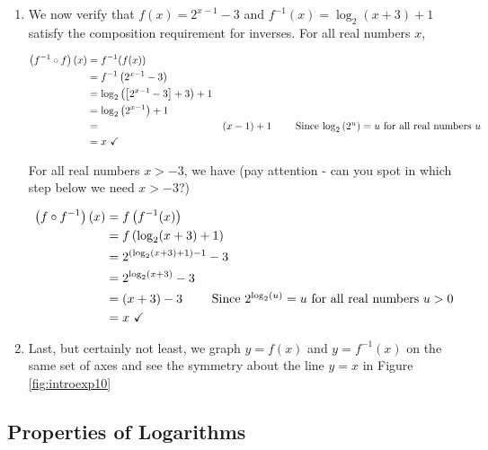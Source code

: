 {\begin{enumerate}
\item  We now verify that $f(x) = 2^{x-1}-3$ and $f^{-1}(x) = \log_{2}(x+3)+1$ satisfy the composition requirement for inverses.  For all real numbers $x$, 

\begin{align*}
\left(f^{-1}\circ f\right)(x) & =  f^{-1}(f(x))  \\
& =  f^{-1}\left(2^{x-1}-3 \right)  \\
& =  \log_{2}\left( \left[2^{x-1}-3\right]+3 \right)+1  \\
& =  \log_{2}\left( 2^{x-1} \right)+1  \\
& =& (x-1) +1  \tag*{ Since $\log_{2}\left(2^{u}\right) = u$ for all real numbers $u$} \\
& =  x \, \, \checkmark 
\end{align*}


For all real numbers $x > -3$, we have (pay attention - can you spot in which step below we need $x > -3$?)

\begin{align*}
\left(f\circ f^{-1}\right)(x) & =  f\left(f^{-1}(x)\right)  \\
& =  f\left( \log_{2}(x+3)+1 \right)  \\
& =  2^{\left( \log_{2}(x+3)+1 \right)-1} - 3  \\
& =  2^{\log_{2}(x+3)} - 3  \\
& =  (x+3) -3 \tag*{ Since $2^{\log_{2}(u)} = u$ for all real numbers $u > 0$} \\
& =  x \, \, \checkmark 
\end{align*}


\item  Last, but certainly not least, we graph $y=f(x)$ and $y=f^{-1}(x)$ on the same set of axes and see the symmetry about the line $y=x$ in Figure \ref{fig:introexp10}


\end{enumerate}
}

\subsection{Properties of Logarithms}

\label{LogProperties}

